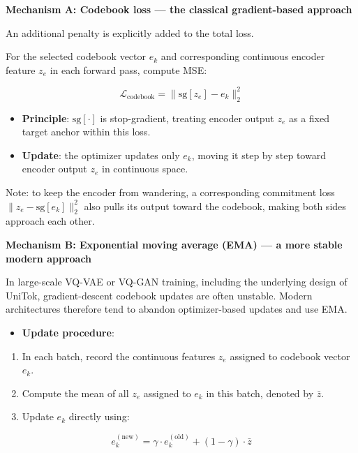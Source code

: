 \textbf{Mechanism A: Codebook loss --- the classical gradient-based approach}

An additional penalty is explicitly added to the total loss.

For the selected codebook vector \(e_k\) and corresponding continuous encoder feature \(z_e\) in each forward pass, compute MSE:

\[
\mathcal{L}_{\mathrm{codebook}}
=\lVert \mathrm{sg}[z_e]-e_k\rVert_2^2
\]

\begin{itemize}
\tightlist
\item
  \textbf{Principle}: \(\mathrm{sg}[\cdot]\) is stop-gradient, treating encoder output \(z_e\) as a fixed target anchor within this loss.
\item
  \textbf{Update}: the optimizer updates only \(e_k\), moving it step by step toward encoder output \(z_e\) in continuous space.
\end{itemize}

Note: to keep the encoder from wandering, a corresponding commitment loss \(\lVert z_e-\mathrm{sg}[e_k]\rVert_2^2\) also pulls its output toward the codebook, making both sides approach each other.

\textbf{Mechanism B: Exponential moving average (EMA) --- a more stable modern approach}

In large-scale VQ-VAE or VQ-GAN training, including the underlying design of UniTok, gradient-descent codebook updates are often unstable. Modern architectures therefore tend to abandon optimizer-based updates and use EMA.

\begin{itemize}
\tightlist
\item
{}
  \textbf{Update procedure}:
\end{itemize}

\begin{enumerate}
\def\labelenumi{\arabic{enumi}.}
\tightlist
\item
  In each batch, record the continuous features \(z_e\) assigned to codebook vector \(e_k\).
\item
  Compute the mean of all \(z_e\) assigned to \(e_k\) in this batch, denoted by \(\bar z\).
\item
{}
  Update \(e_k\) directly using:
\end{enumerate}

\[
e_k^{(\mathrm{new})}
=\gamma\cdot e_k^{(\mathrm{old})}+(1-\gamma)\cdot\bar z
\]

